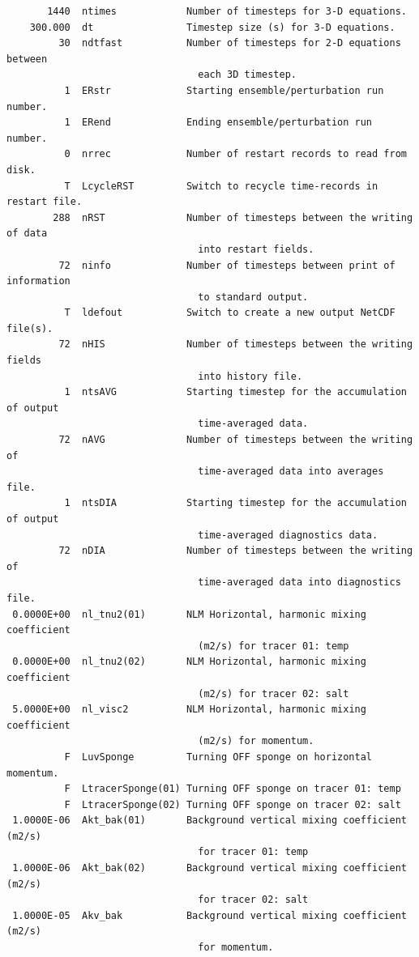 \begin{verbatim}
       1440  ntimes            Number of timesteps for 3-D equations.
    300.000  dt                Timestep size (s) for 3-D equations.
         30  ndtfast           Number of timesteps for 2-D equations between
                                 each 3D timestep.
          1  ERstr             Starting ensemble/perturbation run number.
          1  ERend             Ending ensemble/perturbation run number.
          0  nrrec             Number of restart records to read from disk.
          T  LcycleRST         Switch to recycle time-records in restart file.
        288  nRST              Number of timesteps between the writing of data
                                 into restart fields.
         72  ninfo             Number of timesteps between print of information
                                 to standard output.
          T  ldefout           Switch to create a new output NetCDF file(s).
         72  nHIS              Number of timesteps between the writing fields
                                 into history file.
          1  ntsAVG            Starting timestep for the accumulation of output
                                 time-averaged data.
         72  nAVG              Number of timesteps between the writing of
                                 time-averaged data into averages file.
          1  ntsDIA            Starting timestep for the accumulation of output
                                 time-averaged diagnostics data.
         72  nDIA              Number of timesteps between the writing of
                                 time-averaged data into diagnostics file.
 0.0000E+00  nl_tnu2(01)       NLM Horizontal, harmonic mixing coefficient
                                 (m2/s) for tracer 01: temp
 0.0000E+00  nl_tnu2(02)       NLM Horizontal, harmonic mixing coefficient
                                 (m2/s) for tracer 02: salt
 5.0000E+00  nl_visc2          NLM Horizontal, harmonic mixing coefficient
                                 (m2/s) for momentum.
          F  LuvSponge         Turning OFF sponge on horizontal momentum.
          F  LtracerSponge(01) Turning OFF sponge on tracer 01: temp
          F  LtracerSponge(02) Turning OFF sponge on tracer 02: salt
 1.0000E-06  Akt_bak(01)       Background vertical mixing coefficient (m2/s)
                                 for tracer 01: temp
 1.0000E-06  Akt_bak(02)       Background vertical mixing coefficient (m2/s)
                                 for tracer 02: salt
 1.0000E-05  Akv_bak           Background vertical mixing coefficient (m2/s)
                                 for momentum.

\end{verbatim}
